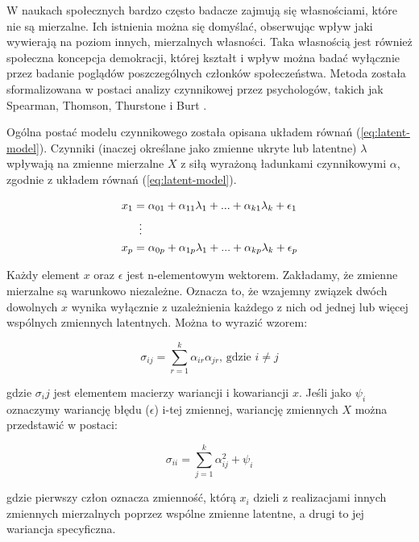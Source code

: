 \documentclass[12pt]{article}
\begin{document}
W naukach społecznych bardzo często badacze zajmują się własnościami, które nie są mierzalne. Ich istnienia można się domyślać, obserwując wpływ jaki wywierają na poziom innych, mierzalnych własności. Taka własnością jest również społeczna koncepcja demokracji, której kształt i wpływ można badać wyłącznie przez badanie poglądów poszczególnych członków społeczeństwa. Metoda została sformalizowana w postaci analizy czynnikowej przez psychologów, takich jak Spearman, Thomson, Thurstone i Burt \citep{Everitt}.

Ogólna postać modelu czynnikowego została opisana układem równań (\ref{eq:latent-model}). Czynniki (inaczej określane jako zmienne ukryte lub latentne) \(\lambda\) wpływają na zmienne mierzalne \(X\) z siłą wyrażoną ładunkami czynnikowymi \(\alpha\), zgodnie z układem równań (\ref{eq:latent-model}).

\begin{align} 
\label{eq:latent-model}
\begin{split}
x_1 &= \alpha_{01} + \alpha_{11} \lambda_1 + ... + \alpha_{k1} \lambda_k + \epsilon_1\\
& \vdotswithin{=} \\
x_p &= \alpha_{0p} + \alpha_{1p} \lambda_1 + ... + \alpha_{kp} \lambda_k + \epsilon_p\\
\end{split}
\end{align}

Każdy element \(x\) oraz \(\epsilon\) jest n-elementowym wektorem. Zakładamy, że zmienne mierzalne są warunkowo niezależne. Oznacza to, że wzajemny związek dwóch dowolnych \(x\) wynika wyłącznie z uzależnienia każdego z nich od jednej lub więcej wspólnych zmiennych latentnych. Można to wyrazić wzorem:

\begin{equation}
\label{eq:shared-var}
\sigma_{ij} = \sum_{r=1}^k \alpha_{ir} \alpha_{jr} \text{, gdzie } i \neq j
\end{equation}

gdzie \(\sigma_ij\) jest elementem macierzy wariancji i kowariancji \(x\).
Jeśli jako \(\psi_i\) oznaczymy wariancję błędu (\(\epsilon\)) i-tej zmiennej, wariancję zmiennych \(X\) można przedstawić w postaci:

\begin{equation}
\label{eq:spec-var}
\sigma_{ii} = \sum_{j=1}^k \alpha_{ij}^2 + \psi_i
\end{equation}

gdzie pierwszy człon oznacza zmienność, którą \(x_i\) dzieli z realizacjami innych zmiennych mierzalnych poprzez wspólne zmienne latentne, a drugi to jej wariancja specyficzna.
\end{document}
